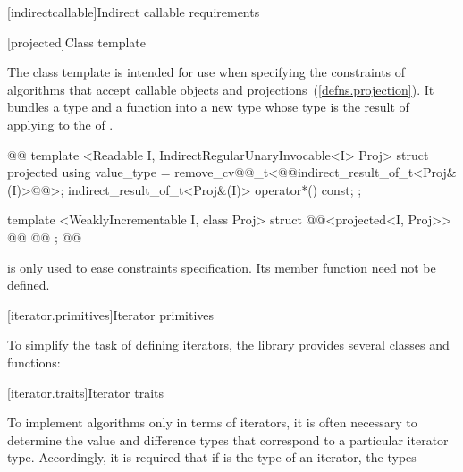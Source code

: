 [indirectcallable]{Indirect callable requirements}

\setcounter{subsubsection}{2}
[projected]{Class template }

\pnum
The  class template is intended for use when specifying the constraints of
algorithms that accept callable objects and projections~(\ref{defns.projection}). It bundles a  type
 and a function  into a new  type whose
 type is the result of applying  to the
 of .

%
\begin{codeblock}
@@
  template <Readable I, IndirectRegularUnaryInvocable<I> Proj>
  struct projected {
    using value_type = remove_cv@@_t<@@indirect_result_of_t<Proj&(I)>@\removed{>}@>;
    indirect_result_of_t<Proj&(I)> operator*() const;
  };

  template <WeaklyIncrementable I, class Proj>
  struct @@<projected<I, Proj>> {
    @@
    @@
  };
@\added{\}\}}@
\end{codeblock}

\pnum
\enternote {} is only used to ease constraints specification. Its
member function need not be defined.\exitnote


[iterator.primitives]{Iterator primitives}

\pnum
To simplify the task of defining iterators, the library provides
several classes and functions:

[iterator.traits]{Iterator traits}


\pnum
{}%
To implement algorithms only in terms of iterators, it is often necessary to
determine the value and
difference types that correspond to a particular iterator type.
Accordingly, it is required that if
is the type of an iterator,
the types

